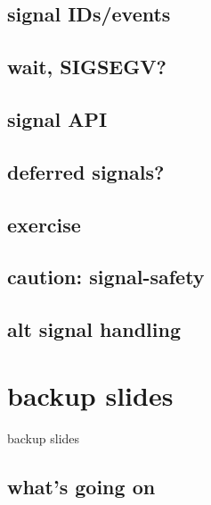\subsection{signal IDs/events}




\subsection{wait, SIGSEGV?}



\subsection{signal API}



\subsection{deferred signals?}


\subsection{exercise}


\subsection{caution: signal-safety}


\subsection{alt signal handling}





\begin{frame}{}
\end{frame}
\begin{frame}{}
\end{frame}

\section{backup slides}
\begin{frame}{backup slides}
\end{frame}

\subsection{what's going on}









